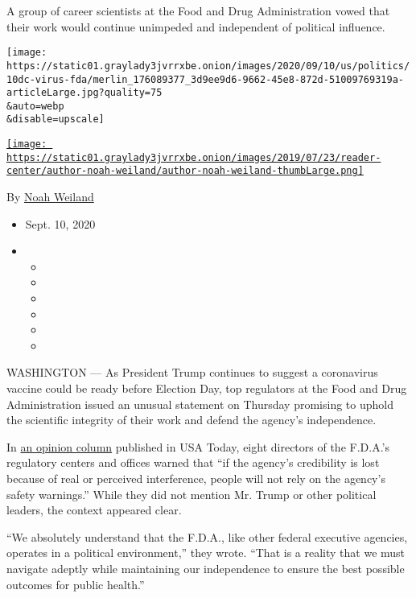A group of career scientists at the Food and Drug Administration vowed
that their work would continue unimpeded and independent of political
influence.

\texttt{[image: https://static01.graylady3jvrrxbe.onion/images/2020/09/10/us/politics/10dc-virus-fda/merlin\_176089377\_3d9ee9d6-9662-45e8-872d-51009769319a-articleLarge.jpg?quality=75\\\&auto=webp\\\&disable=upscale]}

\href{https://www.nytimes3xbfgragh.onion/by/noah-weiland}{\texttt{[image: https://static01.graylady3jvrrxbe.onion/images/2019/07/23/reader-center/author-noah-weiland/author-noah-weiland-thumbLarge.png]}}

By \href{https://www.nytimes3xbfgragh.onion/by/noah-weiland}{Noah
Weiland}

\begin{itemize}
\item
  Sept. 10, 2020
\item
  \begin{itemize}
  \item
  \item
  \item
  \item
  \item
  \item
  \end{itemize}
\end{itemize}

WASHINGTON --- As President Trump continues to suggest a coronavirus
vaccine could be ready before Election Day, top regulators at the Food
and Drug Administration issued an unusual statement on Thursday
promising to uphold the scientific integrity of their work and defend
the agency's independence.

In
\href{https://www.usatoday.com/story/opinion/2020/09/10/sound-science-to-meet-covid-challenges-fda-career-officials-column/5756948002/}{an
opinion column} published in USA Today, eight directors of the F.D.A.'s
regulatory centers and offices warned that ``if the agency's credibility
is lost because of real or perceived interference, people will not rely
on the agency's safety warnings.'' While they did not mention Mr. Trump
or other political leaders, the context appeared clear.

``We absolutely understand that the F.D.A., like other federal executive
agencies, operates in a political environment,'' they wrote. ``That is a
reality that we must navigate adeptly while maintaining our independence
to ensure the best possible outcomes for public health.''


